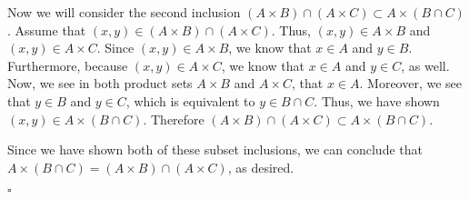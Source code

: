 \documentclass[12pt]{exam}
\begin{document}
\begin{questions}
\par
Now we will consider the second inclusion $(A \times B) \cap (A \times C) \subset A \times (B \cap C)$. Assume that $(x, y) \in (A \times B) \cap (A \times C)$. Thus, $(x, y) \in A \times B$ and $(x, y) \in A \times C$. Since $(x, y) \in A \times B$, we know that $x \in A$ and $y \in B$. Furthermore, because $(x, y) \in A \times C$, we know that $x \in A$ and $y \in C$, as well. Now, we see in both product sets $A \times B$ and $A \times C$, that $x \in A$. Moreover, we see that $y \in B$ and $y \in C$, which is equivalent to $y \in B \cap C$. Thus, we have shown $(x, y) \in A \times (B \cap C)$. Therefore $(A \times B) \cap (A \times C) \subset A \times (B \cap C)$.
\par
Since we have shown both of these subset inclusions, we can conclude that $A \times (B \cap C) = (A \times B) \cap (A \times C)$, as desired. 
\begin{flushright}
$\square$
\end{flushright}


\end{questions}
\end{document}
